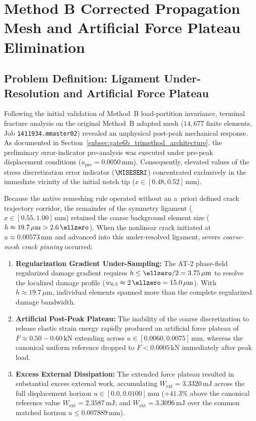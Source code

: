 \section{Method B Corrected Propagation Mesh and Artificial Force Plateau Elimination}
\label{sec:method_b_corrected_propagation}

\subsection{Problem Definition: Ligament Under-Resolution and Artificial Force Plateau}
\label{subsec:method_b_plateau_problem}

Following the initial validation of Method~B load-partition invariance, terminal fracture analysis on the original Method~B adapted mesh ($14{,}677$ finite elements, Job \texttt{1411934.mmaster02}) revealed an unphysical post-peak mechanical response. As documented in Section~\ref{subsec:gate6b_trimethod_architecture}, the preliminary error-indicator pre-analysis was executed under pre-peak displacement conditions ($u_{\mathrm{pre}} = 0.0050\,\mathrm{mm}$). Consequently, elevated values of the stress discretization error indicator ($\MISESERI$) concentrated exclusively in the immediate vicinity of the initial notch tip ($x \in [0.48, 0.52]\,\mathrm{mm}$).

Because the native remeshing rule operated without an a~priori defined crack trajectory corridor, the remainder of the symmetry ligament ($x \in [0.55, 1.00]\,\mathrm{mm}$) retained the coarse background element size ($h \approx 19.7\,\mu\mathrm{m} > 2.6\,\ellzero$). When the nonlinear crack initiated at $u \approx 0.00573\,\mathrm{mm}$ and advanced into this under-resolved ligament, severe \emph{coarse-mesh crack pinning} occurred:
\begin{enumerate}
  \item \textbf{Regularization Gradient Under-Sampling:} The AT-2 phase-field regularized damage gradient requires $h \le \ellzero / 2 = 3.75\,\mu\mathrm{m}$ to resolve the localized damage profile ($w_{0.5} \approx 2\,\ellzero = 15.0\,\mu\mathrm{m}$). With $h \approx 19.7\,\mu\mathrm{m}$, individual elements spanned more than the complete regularized damage bandwidth.
  \item \textbf{Artificial Post-Peak Plateau:} The inability of the coarse discretization to release elastic strain energy rapidly produced an artificial force plateau of $F \approx 0.50 - 0.60\,\mathrm{kN}$ extending across $u \in [0.0060, 0.0075]\,\mathrm{mm}$, whereas the canonical uniform reference dropped to $F < 0.0005\,\mathrm{kN}$ immediately after peak load.
  \item \textbf{Excess External Dissipation:} The extended force plateau resulted in substantial excess external work, accumulating $W_{\mathrm{ext}} = 3.3320\,\mathrm{mJ}$ across the full displacement horizon $u \in [0.0, 0.0100]\,\mathrm{mm}$ ($+41.3\%$ above the canonical reference value $W_{\mathrm{ext}} = 2.3587\,\mathrm{mJ}$; and $W_{\mathrm{ext}} = 3.3096\,\mathrm{mJ}$ over the common matched horizon $u \le 0.007889\,\mathrm{mm}$).
\end{enumerate}

